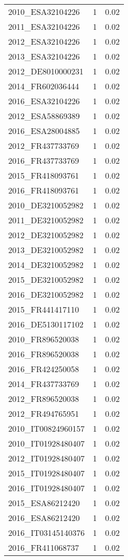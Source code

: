 \begin{table*}[htbp]
\begin{tabular}{lrr}
2010_ESA32104226 & 1 & 0.02 \\
2011_ESA32104226 & 1 & 0.02 \\
2012_ESA32104226 & 1 & 0.02 \\
2013_ESA32104226 & 1 & 0.02 \\
2012_DE8010000231 & 1 & 0.02 \\
2014_FR602036444 & 1 & 0.02 \\
2016_ESA32104226 & 1 & 0.02 \\
2012_ESA58869389 & 1 & 0.02 \\
2016_ESA28004885 & 1 & 0.02 \\
2012_FR437733769 & 1 & 0.02 \\
2016_FR437733769 & 1 & 0.02 \\
2015_FR418093761 & 1 & 0.02 \\
2016_FR418093761 & 1 & 0.02 \\
2010_DE3210052982 & 1 & 0.02 \\
2011_DE3210052982 & 1 & 0.02 \\
2012_DE3210052982 & 1 & 0.02 \\
2013_DE3210052982 & 1 & 0.02 \\
2014_DE3210052982 & 1 & 0.02 \\
2015_DE3210052982 & 1 & 0.02 \\
2016_DE3210052982 & 1 & 0.02 \\
2015_FR441417110 & 1 & 0.02 \\
2016_DE5130117102 & 1 & 0.02 \\
2010_FR896520038 & 1 & 0.02 \\
2016_FR896520038 & 1 & 0.02 \\
2016_FR424250058 & 1 & 0.02 \\
2014_FR437733769 & 1 & 0.02 \\
2012_FR896520038 & 1 & 0.02 \\
2012_FR494765951 & 1 & 0.02 \\
2010_IT00824960157 & 1 & 0.02 \\
2010_IT01928480407 & 1 & 0.02 \\
2012_IT01928480407 & 1 & 0.02 \\
2015_IT01928480407 & 1 & 0.02 \\
2016_IT01928480407 & 1 & 0.02 \\
2015_ESA86212420 & 1 & 0.02 \\
2016_ESA86212420 & 1 & 0.02 \\
2016_IT03145140376 & 1 & 0.02 \\
2016_FR411068737 & 1 & 0.02 \\

\end{tabular}
\end{table*}
